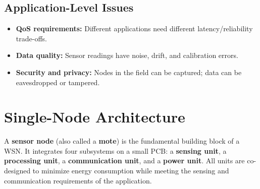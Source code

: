 \documentclass[12pt,a4paper]{article}
\begin{document}
\subsection{Application-Level Issues}
\begin{itemize}[leftmargin=*, itemsep=3pt]
  \item \textbf{QoS requirements:} Different applications need different latency/reliability trade-offs.
  \item \textbf{Data quality:} Sensor readings have noise, drift, and calibration errors.
  \item \textbf{Security and privacy:} Nodes in the field can be captured; data can be eavesdropped or tampered.
\end{itemize}

\section{Single-Node Architecture}

\begin{tcolorbox}[defbox, title={\textbf{Sensor Node Architecture --- Definition}}]
A \textbf{sensor node} (also called a \textbf{mote}) is the fundamental building block of a WSN. It integrates four subsystems on a small PCB: a \textbf{sensing unit}, a \textbf{processing unit}, a \textbf{communication unit}, and a \textbf{power unit}. All units are co-designed to minimize energy consumption while meeting the sensing and communication requirements of the application.
\end{tcolorbox}
\end{document}
